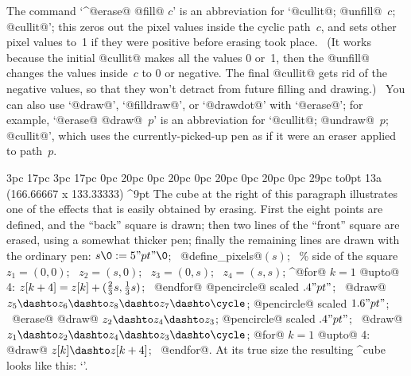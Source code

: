 {{{{\danger The command `^@erase@ @fill@ $c$' is an abbreviation for
`@cullit@; @unfill@~$c$; @cullit@'; this zeros out the pixel values inside
the cyclic path~$c$, and sets other pixel values to~1 if they were positive
before erasing took place. \ (It works because the initial @cullit@ makes
all the values 0 or~1, then the @unfill@ changes the values inside~$c$
to 0 or negative. The final @cullit@ gets rid of the negative values,
so that they won't detract from future filling and drawing.) \ You can
also use `@draw@', `@filldraw@', or `@drawdot@' with `@erase@'; for example,
`@erase@ @draw@~$p$' is an abbreviation for `@cullit@; @undraw@~$p$;
@cullit@', which uses the currently-picked-up pen as if it were an
eraser applied to path~$p$.

{\ninepoint
\medbreak
{} 3pc 17pc 3pc 17pc
0pc 20pc 0pc 20pc 0pc 20pc 0pc 20pc 0pc 29pc
\noindent
\hbox to0pt{\hskip-3pc\dbend\hfill}%
\rightfig 13a ({166.66667\apspix} x {133.33333\apspix}) ^9pt
The cube at the right of this paragraph illustrates one of the effects that
is easily obtained by erasing. First the eight points are defined, and
the ``back'' square is drawn; then two lines of the ``front'' square are
erased, using a somewhat thicker pen; finally the remaining lines are
drawn with the ordinary pen:
\begindisplay
$s\0:=5"pt"\0$; \ @define\_pixels@$(s)$; \ \%  side of the square\cr
$z_1=(0,0)$; \ $z_2=(s,0)$; \ $z_3=(0,s)$; \ $z_4=(s,s)$;\cr
^@for@ $k=1$ @upto@ 4: $z[k+4]=z[k]+({2\over3}s,{1\over3}s)$; \ @endfor@\cr
\pickup @pencircle@ scaled $.4"pt"$; \
@draw@ $z_5\dashto z_6\dashto z_8\dashto z_7\dashto \cycle$;\cr
\pickup @pencircle@ scaled $1.6"pt"$; \
@erase@ @draw@ $z_2\dashto z_4\dashto z_3$;\cr
\pickup @pencircle@ scaled $.4"pt"$; \
@draw@ $z_1\dashto z_2\dashto z_4\dashto z_3\dashto \cycle$;\cr
@for@ $k=1$ @upto@ 4: @draw@ $z[k]\dashto z[k+4]$; \ @endfor@.\cr
\enddisplay
At its true size the resulting ^{cube} looks like this:
`\thinspace{\manual\cubea}\thinspace'.\par}

}}}}
